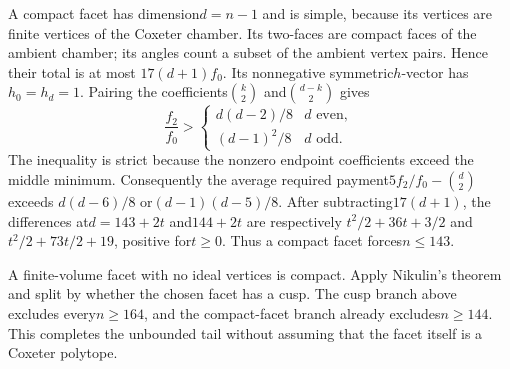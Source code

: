 \documentclass[11pt]{article}
\theoremstyle{remark}\newtheorem{remark}[theorem]{Remark}
\begin{document}
A compact facet has dimension$d=n-1$ and is simple, because its
vertices are finite vertices of the Coxeter chamber. Its two-faces
are compact faces of the ambient chamber; its angles count a
subset of the ambient vertex pairs. Hence their total is at most
$17(d+1)f_0$. Its nonnegative symmetric$h$-vector has$h_0=h_d=1$.
Pairing the coefficients$\binom k2$ and$\binom{d-k}2$ gives
\[
 \frac{f_2}{f_0}>
 \begin{cases}d(d-2)/8&d\text{ even},\\
 (d-1)^2/8&d\text{ odd}.
 \end{cases}
\]
The inequality is strict because the nonzero endpoint coefficients
exceed the middle minimum. Consequently the average required
payment$5f_2/f_0-\binom d2$ exceeds
$d(d-6)/8$ or$(d-1)(d-5)/8$. After subtracting$17(d+1)$,
the differences at$d=143+2t$ and$144+2t$ are respectively
$t^2/2+36t+3/2$ and$t^2/2+73t/2+19$, positive for$t\ge0$.
Thus a compact facet forces$n\le143$.

A finite-volume facet with no ideal vertices is compact. Apply
Nikulin's theorem and split by whether the chosen facet has a
cusp. The cusp branch above excludes every$n\ge164$, and the
compact-facet branch already excludes$n\ge144$. This completes
the unbounded tail without assuming that the facet itself is
a Coxeter polytope.
\end{document}
